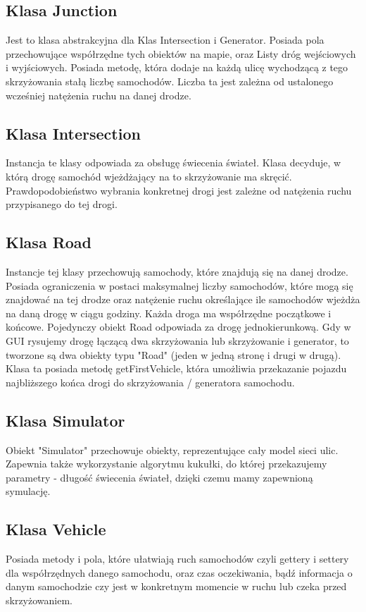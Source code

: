 \documentclass{article}
\begin{document}
\subsection{Klasa Junction}
    Jest to klasa abstrakcyjna dla Klas Intersection i Generator. Posiada pola przechowujące współrzędne tych obiektów na mapie, oraz Listy dróg wejściowych i wyjściowych. Posiada metodę, która dodaje na każdą ulicę wychodzącą z tego skrzyżowania stałą liczbę samochodów. Liczba ta jest zależna od ustalonego wcześniej natężenia ruchu na danej drodze.

\subsection{Klasa Intersection}
    Instancja te klasy odpowiada za obsługę świecenia świateł. Klasa decyduje, w którą drogę samochód wjeżdżający na to skrzyżowanie ma skręcić. Prawdopodobieństwo wybrania konkretnej drogi jest zależne od natężenia ruchu przypisanego do tej drogi.

\subsection{Klasa Road}
    Instancje tej klasy przechowują samochody, które znajdują się na danej drodze. Posiada ograniczenia w postaci maksymalnej liczby samochodów, które mogą się znajdować na tej drodze oraz natężenie ruchu określające ile samochodów wjeżdża na daną drogę w ciągu godziny. Każda droga ma współrzędne początkowe i końcowe. Pojedynczy obiekt Road odpowiada za drogę jednokierunkową. Gdy w GUI rysujemy drogę łączącą dwa skrzyżowania lub skrzyżowanie i generator, to tworzone są dwa obiekty typu "Road" (jeden w jedną stronę i drugi w drugą). Klasa ta posiada metodę getFirstVehicle, która umożliwia przekazanie pojazdu najbliższego końca drogi do skrzyżowania / generatora samochodu.

\subsection{Klasa Simulator}
    Obiekt "Simulator" przechowuje obiekty, reprezentujące cały model sieci ulic. Zapewnia także wykorzystanie algorytmu kukułki, do której przekazujemy parametry - długość świecenia świateł, dzięki czemu mamy zapewnioną symulację.

\subsection{Klasa Vehicle}
    Posiada metody i pola, które ułatwiają ruch samochodów czyli gettery i settery dla współrzędnych danego samochodu, oraz czas oczekiwania, bądź informacja o danym samochodzie czy jest w konkretnym momencie w ruchu lub czeka przed skrzyżowaniem.
\end{document}
